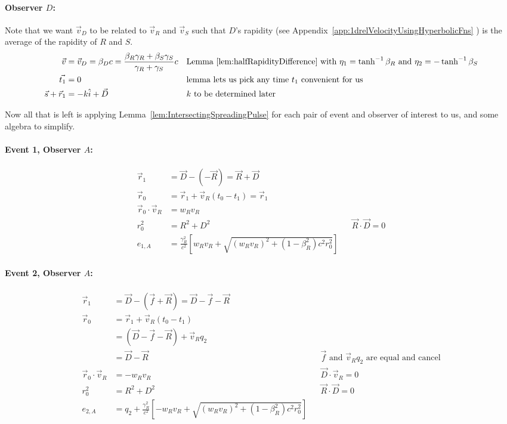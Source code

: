 \documentclass[a4paper]{article}
\theoremstyle{plain}
\theoremstyle{definition}
\newcommand{\vect}[1]{\vec{#1}}
\newcommand{\hatvec}[1]{\hat{#1}}
\newcommand{\ihat}{\hatvec{i}}
\begin{document}
\paragraph{Observer $D$:}

Note that we want $\vect{v}_D$ to be related to $\vect{v}_R$ and
$\vect{v}_S$ such that $D$'s rapidity (see
Appendix~\ref{app:1drelVelocityUsingHyperbolicFns} ) is the average of
the rapidity of $R$ and $S$.
\begin{align}
\vect{v} & = \vect{v}_D = \beta_D c = \frac{\beta_R\gamma_R + \beta_S\gamma_S}{\gamma_R + \gamma_S} c & & \text{Lemma~\ref{lem:halfRapidityDifference} with $\eta_1 = \tanh^{-1}\beta_R$ and $\eta_2 = -\tanh^{-1}\beta_S$} \\
\vect{t_1} & = 0 & & \text{lemma lets us pick any time $t_1$ convenient for us} \\
\vect{s} + \vect{r}_1 & = -k\ihat + \vect{D} & & \text{$k$ to be determined later}
\end{align}

Now all that is left is applying
Lemma~\ref{lem:IntersectingSpreadingPulse} for each pair of event and
observer of interest to us, and some algebra to simplify.


\paragraph{Event 1, Observer $A$:}

\begin{align*}
\vect{r}_1 & = \vect{D} - (-\vect{R}) = \vect{R} + \vect{D} \\
\vect{r}_0 & = \vect{r}_1 + \vect{v}_R (t_0 - t_1) = \vect{r}_1 \\
\vect{r}_0 \cdot \vect{v}_R & = w_Rv_R \\
r_0^2 & = R^2 + D^2 & & \text{$\vect{R} \cdot \vect{D} = 0$} \\
e_{1,A} & = \frac{\gamma_R^2}{c^2} \left[ w_Rv_R + \sqrt{ (w_Rv_R)^2 + (1-\beta_R^2)c^2r_0^2 } \right]
\end{align*}


\paragraph{Event 2, Observer $A$:}

\begin{align*}
\vect{r}_1 & = \vect{D} - (\vect{f}+\vect{R}) = \vect{D} - \vect{f} - \vect{R} \\
\vect{r}_0
  & = \vect{r}_1 + \vect{v}_R (t_0 - t_1) \\
  & = (\vect{D} - \vect{f} - \vect{R}) + \vect{v}_R q_2 \\
  & = \vect{D} - \vect{R} & & \text{$\vect{f}$ and $\vect{v}_R q_2$ are equal and cancel} \\
\vect{r}_0 \cdot \vect{v}_R & = -w_Rv_R & & \text{$\vect{D} \cdot \vect{v}_R = 0$} \\
r_0^2 & = R^2 + D^2 & & \text{$\vect{R} \cdot \vect{D} = 0$} \\
e_{2,A} & = q_2 + \frac{\gamma_R^2}{c^2} \left[ -w_Rv_R + \sqrt{ (w_Rv_R)^2 + (1-\beta_R^2)c^2r_0^2 } \right]
\end{align*}
\end{document}
